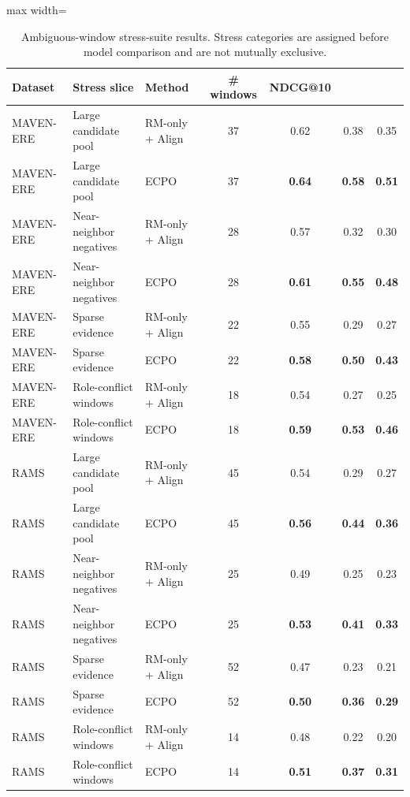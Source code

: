 \documentclass{article}
\newcommand{\ECPO}{\textsc{ECPO}}
\begin{document}
\begin{table}[t]
\centering
\caption{Ambiguous-window stress-suite results. Stress categories are assigned before model comparison and are not mutually exclusive.}
\label{tab:hard_windows}
\small
\begin{adjustbox}{max width=\textwidth}
\begin{tabular}{l l l c c c c}
\toprule
Dataset & Stress slice & Method & \# windows & NDCG@10 & \EvidCons@10 & \CertNDCG@10 \\
\midrule
MAVEN-ERE & Large candidate pool & RM-only + Align & 37 & 0.62 & 0.38 & 0.35 \\
MAVEN-ERE & Large candidate pool & \ECPO & 37 & \textbf{0.64} & \textbf{0.58} & \textbf{0.51} \\
MAVEN-ERE & Near-neighbor negatives & RM-only + Align & 28 & 0.57 & 0.32 & 0.30 \\
MAVEN-ERE & Near-neighbor negatives & \ECPO & 28 & \textbf{0.61} & \textbf{0.55} & \textbf{0.48} \\
MAVEN-ERE & Sparse evidence & RM-only + Align & 22 & 0.55 & 0.29 & 0.27 \\
MAVEN-ERE & Sparse evidence & \ECPO & 22 & \textbf{0.58} & \textbf{0.50} & \textbf{0.43} \\
MAVEN-ERE & Role-conflict windows & RM-only + Align & 18 & 0.54 & 0.27 & 0.25 \\
MAVEN-ERE & Role-conflict windows & \ECPO & 18 & \textbf{0.59} & \textbf{0.53} & \textbf{0.46} \\
\midrule
RAMS & Large candidate pool & RM-only + Align & 45 & 0.54 & 0.29 & 0.27 \\
RAMS & Large candidate pool & \ECPO & 45 & \textbf{0.56} & \textbf{0.44} & \textbf{0.36} \\
RAMS & Near-neighbor negatives & RM-only + Align & 25 & 0.49 & 0.25 & 0.23 \\
RAMS & Near-neighbor negatives & \ECPO & 25 & \textbf{0.53} & \textbf{0.41} & \textbf{0.33} \\
RAMS & Sparse evidence & RM-only + Align & 52 & 0.47 & 0.23 & 0.21 \\
RAMS & Sparse evidence & \ECPO & 52 & \textbf{0.50} & \textbf{0.36} & \textbf{0.29} \\
RAMS & Role-conflict windows & RM-only + Align & 14 & 0.48 & 0.22 & 0.20 \\
RAMS & Role-conflict windows & \ECPO & 14 & \textbf{0.51} & \textbf{0.37} & \textbf{0.31} \\
\bottomrule
\end{tabular}
\end{adjustbox}
\end{table}
\end{document}
